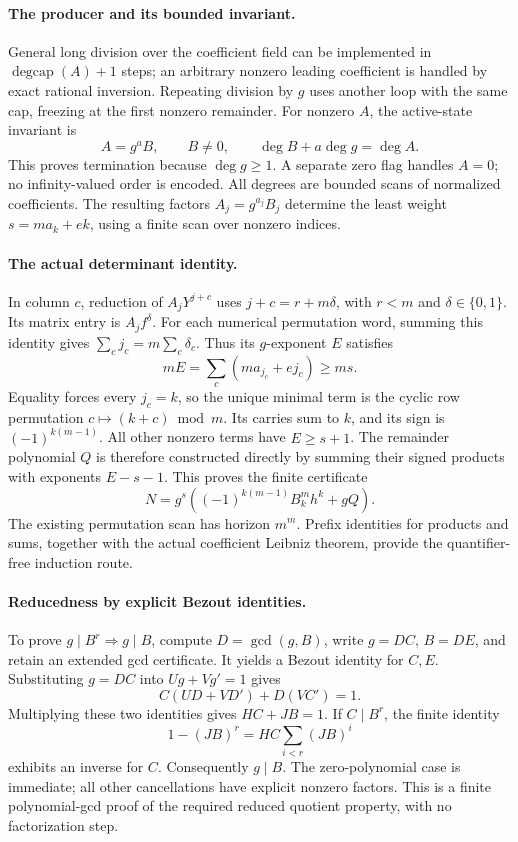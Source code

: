 \paragraph{The producer and its bounded invariant.}
General long division over the coefficient field can be implemented in
\(\operatorname{degcap}(A)+1\) steps; an arbitrary nonzero leading coefficient is
handled by exact rational inversion.  Repeating division by \(g\) uses
another loop with the same cap, freezing at the first nonzero remainder.
For nonzero \(A\), the active-state invariant is
\[
 A=g^aB,\qquad B\ne0,\qquad
 \deg B+a\deg g=\deg A.
\]
This proves termination because \(\deg g\geq1\).
A separate zero flag handles \(A=0\); no infinity-valued order is
encoded.  All degrees are bounded scans of normalized coefficients.
The resulting factors \(A_j=g^{a_j}B_j\) determine the least weight
\(s=ma_k+ek\), using a finite scan over nonzero indices.

\paragraph{The actual determinant identity.}
In column \(c\), reduction of \(A_jY^{j+c}\) uses
\(j+c=r+m\delta\), with \(r<m\) and \(\delta\in\{0,1\}\).
Its matrix entry is \(A_jf^\delta\).  For each numerical permutation
word, summing this identity gives
\(\sum_c j_c=m\sum_c\delta_c\).
Thus its \(g\)-exponent \(E\) satisfies
\[
 mE=\sum_c(ma_{j_c}+ej_c)\geq ms.
\]
Equality forces every \(j_c=k\), so the unique minimal term is the
cyclic row permutation \(c\mapsto(k+c)\bmod m\).  Its carries sum to
\(k\), and its sign is \((-1)^{k(m-1)}\).
All other nonzero terms have \(E\geq s+1\).  The remainder polynomial
\(Q\) is therefore constructed directly by summing their signed
products with exponents \(E-s-1\).  This proves the finite certificate
\[
 N=g^s\left((-1)^{k(m-1)}B_k^m h^k+gQ\right).
\]
The existing permutation scan has horizon \(m^m\).
Prefix identities for products and sums, together with the actual
coefficient Leibniz theorem, provide the quantifier-free induction route.

\paragraph{Reducedness by explicit Bezout identities.}
To prove \(g\mid B^r\Rightarrow g\mid B\), compute
\(D=\gcd(g,B)\), write \(g=DC\), \(B=DE\), and retain an extended
gcd certificate.  It yields a Bezout identity for \(C,E\).
Substituting \(g=DC\) into \(Ug+Vg'=1\) gives
\[
 C(UD+VD')+D(VC')=1.
\]
Multiplying these two identities gives \(HC+JB=1\).
If \(C\mid B^r\), the finite identity
\[
 1-(JB)^r=HC\sum_{i<r}(JB)^i
\]
exhibits an inverse for \(C\).  Consequently \(g\mid B\).
The zero-polynomial case is immediate; all other cancellations have
explicit nonzero factors.  This is a finite polynomial-gcd proof of the
required reduced quotient property, with no factorization step.

